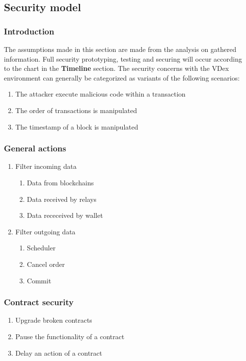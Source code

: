 \documentclass[]{article}
\begin{document}
\subsection{Security model}
\subsubsection{Introduction}
The assumptions made in this section are made from the analysis 
on gathered information.
Full security prototyping, testing and securing will occur according to the chart in the \textbf{Timeline} section. 
The security concerns with the VDex environment can generally be categorized as variants of the following scenarios:
	\begin{enumerate}
		\item The attacker execute malicious code within a transaction
		\item The order of transactions is manipulated
		\item The timestamp of a block is manipulated
	\end{enumerate}
	\subsubsection{General actions}
		\begin{enumerate}	
		\item{Filter incoming data} 
		\begin{enumerate}
			\item Data from blockchains
			\item Data received by relays
			\item Data receceived by wallet
		\end{enumerate}
		\item {Filter outgoing data}
		\begin{enumerate}
			\item Scheduler
			\item Cancel order
			\item Commit
		\end{enumerate}
	\end{enumerate}
		\subsubsection{Contract security}
		\begin{enumerate}
		\item Upgrade broken contracts
		\item Pause the functionality of a contract 
		\item Delay an action of a contract	
		\end{enumerate}
\end{document}
